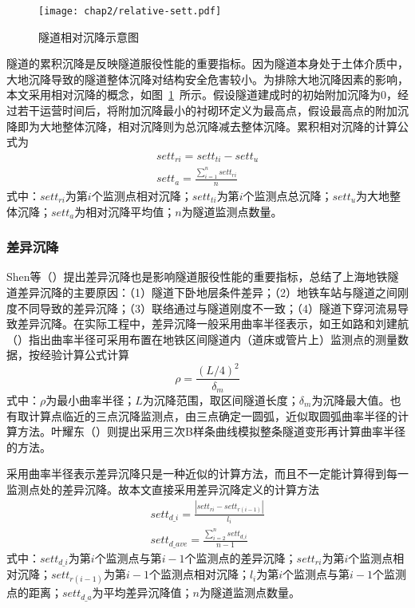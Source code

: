 \begin{figure}[htbp]
    \centering
    \texttt{[image: chap2/relative-sett.pdf]}
    \caption{隧道相对沉降示意图}
    \label{fig:隧道相对沉降示意图}
\end{figure}

隧道的累积沉降是反映隧道服役性能的重要指标。因为隧道本身处于土体介质中，大地沉降导致的隧道整体沉降对结构安全危害较小。为排除大地沉降因素的影响，本文采用相对沉降的概念，如图~\ref{fig:隧道相对沉降示意图}~所示。假设隧道建成时的初始附加沉降为0，经过若干运营时间后，将附加沉降最小的衬砌环定义为最高点，假设最高点的附加沉降即为大地整体沉降，相对沉降则为总沉降减去整体沉降。累积相对沉降的计算公式为
\begin{align}
    \label{equ:sett_r}
    {sett}_{ri}={sett}_{ti}-{sett}_{u} \\
    \label{equ:sett_ave}
    {sett}_{a}=\frac{\sum\limits_{i=1}^{n}{{sett}_{ri}}}{n}
\end{align}
式中：${sett}_{ri}$为第$i$个监测点相对沉降；${sett}_{ti}$为第$i$个监测点总沉降；${sett}_{u}$为大地整体沉降；${sett}_{a}$为相对沉降平均值；$n$为隧道监测点数量。

\subsubsection{差异沉降}

Shen等（\citeyear{shen2014long}）提出差异沉降也是影响隧道服役性能的重要指标，总结了上海地铁隧道差异沉降的主要原因：（1）隧道下卧地层条件差异；（2）地铁车站与隧道之间刚度不同导致的差异沉降；（3）联络通过与隧道刚度不一致；（4）隧道下穿河流易导致差异沉降。在实际工程中，差异沉降一般采用曲率半径表示，如王如路和刘建航（\citeyear{王如路2004上海地铁监护实践}）指出曲率半径可采用布置在地铁区间隧道内（道床或管片上）监测点的测量数据，按经验计算公式计算
\begin{equation}
    \label{equ:ratio1}
    \rho =\frac{{{(L/4)}^{2}}}{{{\delta }_{m}}}
\end{equation}
式中：$\rho$为最小曲率半径；$L$为沉降范围，取区间隧道长度；${\delta }_{m}$为沉降最大值。也有取计算点临近的三点沉降监测点，由三点确定一圆弧，近似取圆弧曲率半径的计算方法。叶耀东（\citeyear{叶耀东2007软土地区运营地铁盾构隧道结构变形及健康诊断方法研究}）则提出采用三次B样条曲线模拟整条隧道变形再计算曲率半径的方法。

采用曲率半径表示差异沉降只是一种近似的计算方法，而且不一定能计算得到每一监测点处的差异沉降。故本文直接采用差异沉降定义的计算方法
\begin{align}
    \label{equ:diff_sett}
    set{{t}_{d\_i}}=\frac{\left| set{{t}_{ri}}-set{{t}_{r(i-1)}} \right|}{{{l}_{i}}} \\
    \label{equ:diff_sett_ave}
    set{{t}_{d\_ave}}=\frac{\sum\limits_{i=2}^{n}{set{{t}_{d\_i}}}}{n-1}
\end{align}
式中：$set{{t}_{d\_i}}$为第$i$个监测点与第$i-1$个监测点的差异沉降；$set{{t}_{ri}}$为第$i$个监测点相对沉降；$set{{t}_{r(i-1)}}$为第$i-1$个监测点相对沉降；${l}_{i}$为第$i$个监测点与第$i-1$个监测点的距离；$set{{t}_{d\_a}}$为平均差异沉降值；$n$为隧道监测点数量。

